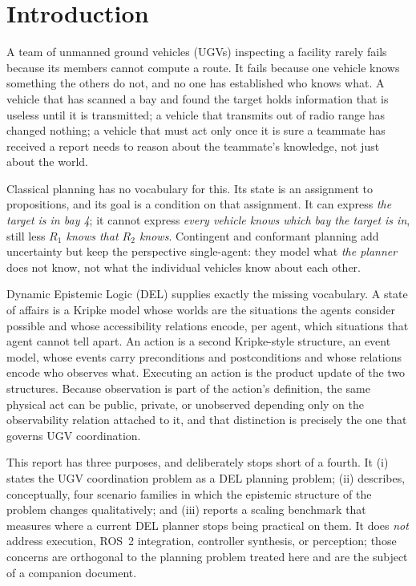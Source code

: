 \documentclass[11pt,a4paper]{article}
\theoremstyle{definition}
\begin{document}
\tableofcontents
\thispagestyle{empty}
\clearpage
\setcounter{page}{1}

\section{Introduction}

A team of unmanned ground vehicles (UGVs) inspecting a facility rarely fails
because its members cannot compute a route. It fails because one vehicle knows
something the others do not, and no one has established who knows what. A
vehicle that has scanned a bay and found the target holds information that is
useless until it is transmitted; a vehicle that transmits out of radio range
has changed nothing; a vehicle that must act only once it is sure a teammate
has received a report needs to reason about the teammate's knowledge, not just
about the world.

Classical planning has no vocabulary for this. Its state is an assignment to
propositions, and its goal is a condition on that assignment. It can express
\emph{the target is in bay 4}; it cannot express \emph{every vehicle knows
which bay the target is in}, still less \emph{$R_1$ knows that $R_2$ knows}.
Contingent and conformant planning add uncertainty but keep the perspective
single-agent: they model what \emph{the planner} does not know, not what the
individual vehicles know about each other.

Dynamic Epistemic Logic (DEL) supplies exactly the missing vocabulary. A state
of affairs is a Kripke model whose worlds are the situations the agents
consider possible and whose accessibility relations encode, per agent, which
situations that agent cannot tell apart. An action is a second Kripke-style
structure, an event model, whose events carry preconditions and
postconditions and whose relations encode who observes what. Executing an
action is the product update of the two structures. Because observation is
part of the action's definition, the same physical act can be public, private,
or unobserved depending only on the observability relation attached to it, and
that distinction is precisely the one that governs UGV coordination.

This report has three purposes, and deliberately stops short of a fourth. It
(i) states the UGV coordination problem as a DEL planning problem; (ii)
describes, conceptually, four scenario families in which the epistemic
structure of the problem changes qualitatively; and (iii) reports a scaling
benchmark that measures where a current DEL planner stops being practical on
them. It does \emph{not} address execution, ROS~2 integration, controller
synthesis, or perception; those concerns are orthogonal to the planning
problem treated here and are the subject of a companion document.
\end{document}
